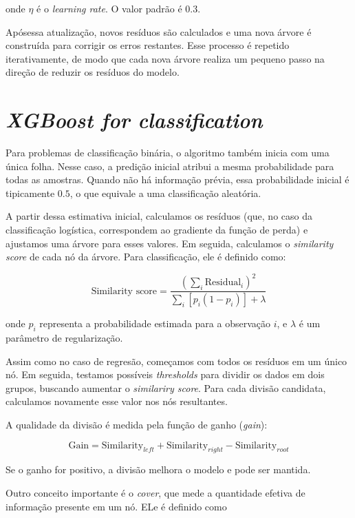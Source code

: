 \documentclass{article}
\begin{document}
onde $\eta$ é o \textit{learning rate}. O valor padrão é $0.3$.

Apósessa atualização, novos resíduos são calculados e uma nova árvore
é construída para corrigir os erros restantes. Esse processo é repetido 
iterativamente, de modo que cada nova árvore realiza um pequeno passo 
na direção de reduzir os resíduos do modelo.

\section{\textit{XGBoost for classification}}

Para problemas de classificação binária, o algoritmo também inicia 
com uma única folha. Nesse caso, a predição inicial atribui a mesma 
probabilidade para todas as amostras. Quando não há informação prévia, 
essa probabilidade inicial é tipicamente $0.5$, o que equivale a uma 
classificação aleatória.

A partir dessa estimativa inicial, calculamos os resíduos (que, no caso 
da classificação logística, correspondem ao gradiente da função de perda) e
ajustamos uma árvore para esses valores. Em seguida, calculamos o 
\textit{similarity score} de cada nó da árvore. Para classificação, ele é
definido como:

\begin{equation}
\text{Similarity score} =
\frac{\left(\sum_i \text{Residual}_i\right)^2}
{\sum_i \left[p_i (1 - p_i)\right] + \lambda}
\end{equation}

onde $p_i$ representa a probabilidade estimada para a observação $i$, e 
$\lambda$ é um parâmetro de regularização.

Assim como no caso de regresão, começamos com todos os resíduos em um 
único nó. Em seguida, testamos possíveis \textit{thresholds} para dividir 
os dados em dois grupos, buscando aumentar o \textit{similariry score}. 
Para cada divisão candidata, calculamos novamente esse valor nos nós 
resultantes.

A qualidade da divisão é medida pela função de ganho (\textit{gain}):

\begin{equation}
\text{Gain} =
\text{Similarity}_{left} +
\text{Similarity}_{right} -
\text{Similarity}_{root}
\end{equation}

Se o ganho for positivo, a divisão melhora o modelo e pode ser mantida.

Outro conceito importante é o \textit{cover}, que mede a quantidade efetiva
de informação presente em um nó. ELe é definido como
\end{document}
